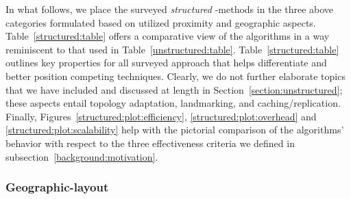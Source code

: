 In what follows, we place the surveyed \emph{structured} \p-methods in 
the three above categories formulated based on 
utilized proximity and geographic aspects.
Table~\ref{structured:table} offers a comparative view
of the algorithms in a way reminiscent to that used in Table~\ref{unstructured:table}.
Table~\ref{structured:table} outlines key properties for all surveyed approach 
that helps differentiate and better position competing techniques.
Clearly, we do not further elaborate topics that we have included and discussed 
at length in Section~\ref{section:unstructured}; these aspects entail 
topology adaptation, landmarking, and caching/replication.
Finally, Figures~\ref{structured:plot:efficiency}, \ref{structured:plot:overhead}
and \ref{structured:plot:scalability} help with the pictorial comparison
of the algorithms' behavior with respect to the three effectiveness
criteria we defined in subsection~\ref{background:motivation}.

\subsubsection{Geographic-layout} \label{section:geographic_layout}


